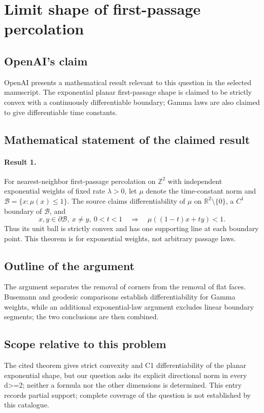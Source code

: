 \documentclass[11pt]{article}
\begin{document}
\section*{Limit shape of first-passage percolation}

\subsection{OpenAI's claim}
OpenAI presents a mathematical result relevant to this question in the selected manuscript. The exponential planar first-passage shape is claimed to be strictly convex with a continuously differentiable boundary; Gamma laws are also claimed to give differentiable time constants.

\subsection{Mathematical statement of the claimed result}
\paragraph{Result 1.} For nearest-neighbor first-passage percolation on \(\mathbb Z^2\) with independent exponential weights of fixed rate \(\lambda>0\), let \(\mu\) denote the time-constant norm and \(\mathcal B=\{x:\mu(x)\le1\}\). The source claims differentiability of \(\mu\) on \(\mathbb R^2\setminus\{0\}\), a \(C^1\) boundary of \(\mathcal B\), and
\[
 x,y\in\partial\mathcal B,\ x\ne y,\ 0<t<1
 \quad\Longrightarrow\quad\mu((1-t)x+ty)<1.
\]
Thus its unit ball is strictly convex and has one supporting line at each boundary point. This theorem is for exponential weights, not arbitrary passage laws.

\subsection{Outline of the argument}
The argument separates the removal of corners from the removal of flat faces. Busemann and geodesic comparisons establish differentiability for Gamma weights, while an additional exponential-law argument excludes linear boundary segments; the two conclusions are then combined.

\subsection{Scope relative to this problem}
The cited theorem gives strict convexity and C1 differentiability of the planar exponential shape, but our question asks its explicit directional norm in every d>=2; neither a formula nor the other dimensions is determined. This entry records partial support; complete coverage of the question is not established by this catalogue.
\end{document}
